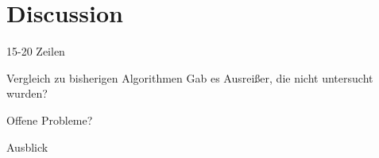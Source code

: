 \section{Discussion}
\label{sec:discussion}

15-20 Zeilen

Vergleich zu bisherigen Algorithmen
Gab es Ausreißer, die nicht untersucht wurden?

Offene Probleme?


Ausblick
